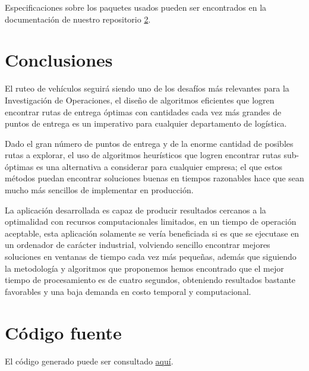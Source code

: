 \documentclass[journal]{IEEEtran}
\begin{document}
        Especificaciones sobre los paquetes usados pueden ser encontrados en la documentación de nuestro repositorio \ref{code:repo}.

    \section{Conclusiones} \label{sec:conclusions}
        
        El ruteo de vehículos seguirá siendo uno de los desafíos más relevantes para la Investigación de Operaciones, el diseño de algoritmos eficientes que logren encontrar rutas de entrega óptimas con cantidades cada vez más grandes de puntos de entrega es un imperativo para cualquier departamento de logística.
        
        Dado el gran número de puntos de entrega y de la enorme cantidad de posibles rutas a explorar, el uso de algoritmos heurísticos que logren encontrar rutas sub-óptimas es una alternativa a considerar para cualquier empresa; el que estos métodos puedan encontrar soluciones buenas en tiempos razonables hace que sean mucho más sencillos de implementar en producción.
        
        La aplicación desarrollada es capaz de producir resultados cercanos a la optimalidad con recursos computacionales limitados, en un tiempo de operación aceptable, esta aplicación solamente se vería beneficiada si es que se ejecutase en un ordenador de carácter industrial, volviendo sencillo encontrar mejores soluciones en ventanas de tiempo cada vez más pequeñas, además que siguiendo la metodología y algoritmos que proponemos hemos encontrado que el mejor tiempo de procesamiento es de cuatro segundos, obteniendo resultados bastante favorables y una baja demanda en costo temporal y computacional.
        
    \appendices
    
    \section{Código fuente}\label{code:repo}
    
        El código generado puede ser consultado \href{https://github.com/JuanEcheagaray75/capacitated-vrp}{aquí}.
    
    
    
\end{document}
